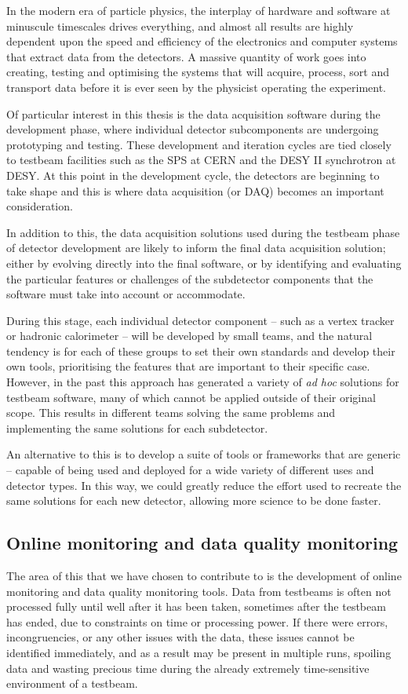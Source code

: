 In the modern era of particle physics, the interplay of hardware and software at minuscule timescales drives everything, and almost all results are highly dependent upon the speed and efficiency of the electronics and computer systems that extract data from the detectors. A massive quantity of work goes into creating, testing and optimising the systems that will acquire, process, sort and transport data before it is ever seen by the physicist operating the experiment.

Of particular interest in this thesis is the data acquisition software during the development phase, where individual detector subcomponents are undergoing prototyping and testing. These development and iteration cycles are tied closely to testbeam facilities such as the \acrfull{SPS} at \acrshort{CERN} and the DESY II synchrotron at \acrshort{DESY}. At this point in the development cycle, the detectors are beginning to take shape and this is where data acquisition (or \acrshort{DAQ}) becomes an important consideration. 

In addition to this, the data acquisition solutions used during the testbeam phase of detector development are likely to inform the final data acquisition solution; either by evolving directly into the final software, or by identifying and evaluating the particular features or challenges of the subdetector components that the software must take into account or accommodate.

During this stage, each individual detector component -- such as a vertex tracker or hadronic calorimeter -- will be developed by small teams, and the natural tendency is for each of these groups to set their own standards and develop their own tools, prioritising the features that are important to their specific case. However, in the past this approach has generated a variety of \textit{ad hoc} solutions for testbeam software, many of which cannot be applied outside of their original scope. This results in different teams solving the same problems and implementing the same solutions for each subdetector.

An alternative to this is to develop a suite of tools or frameworks that are generic -- capable of being used and deployed for a wide variety of different uses and detector types. In this way, we could greatly reduce the effort used to recreate the same solutions for each new detector, allowing more science to be done faster.

\subsection{Online monitoring and data quality monitoring}
The area of this that we have chosen to contribute to is the development of online monitoring and data quality monitoring tools. Data from testbeams is often not processed fully until well after it has been taken, sometimes after the testbeam has ended, due to constraints on time or processing power. If there were errors, incongruencies, or any other issues with the data, these issues cannot be identified immediately, and as a result may be present in multiple runs, spoiling data and wasting precious time during the already extremely time-sensitive environment of a testbeam.


